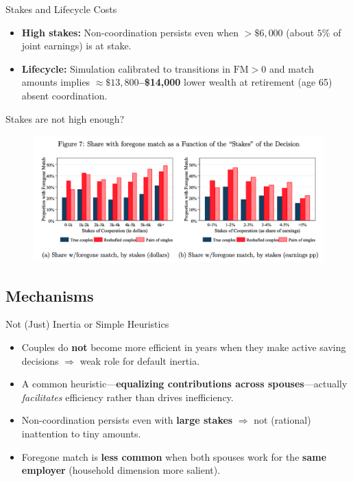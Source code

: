 \documentclass[11pt,notes=hide,aspectratio=169,mathserif]{beamer}
\begin{document}
\begin{frame}{Stakes and Lifecycle Costs}
\small
\begin{itemize}
  \item \textbf{High stakes:} Non-coordination persists even when $>\$6{,}000$ (about $5\%$ of joint earnings) is at stake.
  \item \textbf{Lifecycle:} Simulation calibrated to transitions in $\mathrm{FM}>0$ and match amounts implies \textbf{$\approx\$13{,}800$--\$14{,}000} lower wealth at retirement (age 65) absent coordination.
\end{itemize}
\end{frame}

\begin{frame}{Stakes are not high enough?}
\small
\begin{figure}
\centering
\includegraphics[width=0.9\linewidth]{inputs/fig7.png}
\end{figure}
\end{frame}

\subsection{Mechanisms}

\begin{frame}{Not (Just) Inertia or Simple Heuristics}
\small
\begin{itemize}
  \item Couples do \textbf{not} become more efficient in years when they make active saving decisions $\Rightarrow$ weak role for default inertia.
  \item A common heuristic---\textbf{equalizing contributions across spouses}---actually \emph{facilitates} efficiency rather than drives inefficiency.
  \item Non-coordination persists even with \textbf{large stakes} $\Rightarrow$ not (rational) inattention to tiny amounts.
  \item Foregone match is \textbf{less common} when both spouses work for the \textbf{same employer} (household dimension more salient).
\end{itemize}
\end{frame}
\end{document}
